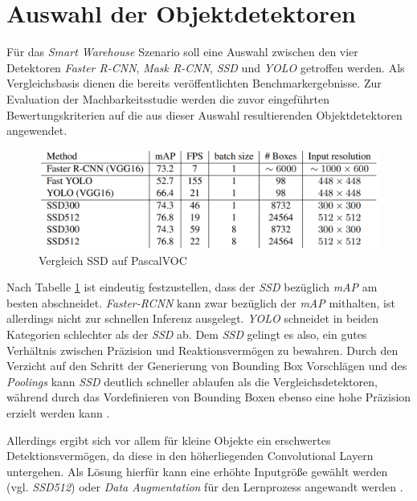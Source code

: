 \section{Auswahl der Objektdetektoren}

Für das \textit{Smart Warehouse} Szenario soll eine Auswahl zwischen den vier Detektoren \textit{Faster R-CNN}, \textit{Mask R-CNN}, \textit{SSD} und \textit{YOLO} getroffen werden. Als Vergleichsbasis dienen die bereits veröffentlichten Benchmarkergebnisse. Zur Evaluation der Machbarkeitsstudie werden die zuvor eingeführten Bewertungskriterien auf die aus dieser Auswahl resultierenden Objektdetektoren angewendet.

\begin{figure}[ht]
	\begin{center}
		\includegraphics[width=12cm]{Bilder/ssd_results.png} 
		\caption[Vergleich SSD auf PascalVOC]{Vergleich SSD auf PascalVOC \cite{ssd.20161229}}
		\label{result}
	\end{center}
\end{figure}

Nach Tabelle \ref{result} ist eindeutig festzustellen, dass der \textit{SSD} bezüglich \textit{mAP} am besten abschneidet. \textit{Faster-RCNN} kann zwar bezüglich der \textit{mAP} mithalten, ist allerdings nicht zur schnellen Inferenz ausgelegt. \textit{YOLO} schneidet in beiden Kategorien schlechter als der \textit{SSD} ab. Dem \textit{SSD} gelingt es also, ein gutes Verhältnis zwischen Präzision und Reaktionsvermögen zu bewahren. Durch den Verzicht auf den Schritt der Generierung von Bounding Box Vorschlägen und des \textit{Poolings} kann \textit{SSD} deutlich schneller ablaufen als die Vergleichsdetektoren, während durch das Vordefinieren von Bounding Boxen ebenso eine hohe Präzision erzielt werden kann \cite{ssd.20161229}.

Allerdings ergibt sich vor allem für kleine Objekte ein erschwertes Detektionsvermögen, da diese in den höherliegenden Convolutional Layern untergehen. Als Lösung hierfür kann eine erhöhte Inputgröße gewählt werden (vgl. \textit{SSD512}) oder \textit{Data Augmentation} für den Lernprozess angewandt werden \cite{ssd.20161229}.

